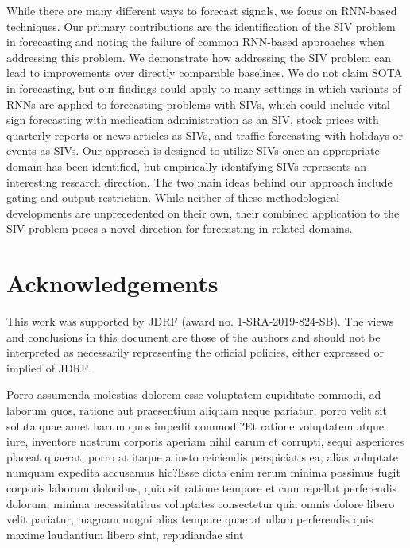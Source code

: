 \documentclass[letterpaper]{article}
\begin{document}
While there are many different ways to forecast signals, we focus on RNN-based techniques. Our primary contributions are the identification of the SIV problem in forecasting and noting the failure of common RNN-based approaches when addressing this problem. We demonstrate how addressing the SIV problem can lead to improvements over directly comparable baselines. We do not claim SOTA in forecasting, but our findings could apply to many settings in which variants of RNNs are applied to forecasting problems with SIVs, which could include vital sign forecasting with medication administration as an SIV, stock prices with quarterly reports or news articles as SIVs, and  traffic forecasting with holidays or events as SIVs. Our approach is designed to utilize SIVs once an appropriate domain has been identified, but empirically identifying SIVs represents an interesting research direction. The two main ideas behind our approach include gating and output restriction. While neither of these methodological developments are unprecedented on their own, their combined application to the SIV problem poses a novel direction for forecasting in related domains.



\vspace{-3.02mm}
\section*{Acknowledgements} This work was supported by JDRF (award no. 1-SRA-2019-824-SB).  The views and conclusions in this document are those of the authors and should not be interpreted as necessarily representing the official policies, either expressed or implied of JDRF.


Porro assumenda molestias dolorem esse voluptatem cupiditate commodi, ad laborum quos, ratione aut praesentium aliquam neque pariatur, porro velit sit soluta quae amet harum quos impedit commodi?Et ratione voluptatem atque iure, inventore nostrum corporis aperiam nihil earum et corrupti, sequi asperiores placeat quaerat, porro at itaque a iusto reiciendis perspiciatis ea, alias voluptate numquam expedita accusamus hic?Esse dicta enim rerum minima possimus fugit corporis laborum doloribus, quia sit ratione tempore et cum repellat perferendis dolorum, minima necessitatibus voluptates consectetur quia omnis dolore libero velit pariatur, magnam magni alias tempore quaerat ullam perferendis quis maxime laudantium libero sint, repudiandae sint

\end{document}
